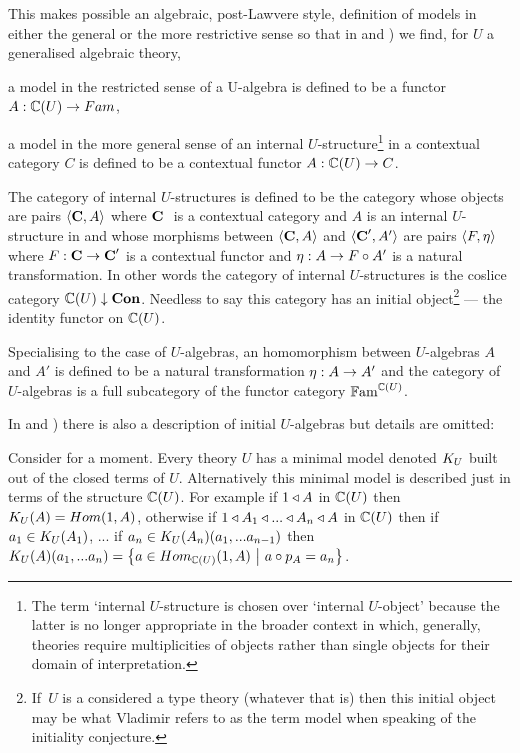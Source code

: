 {This makes possible an  algebraic, post-Lawvere
style,  definition of models in either the general or the more restrictive sense so that in 
\cite{Cartmell78} and  \cite{Cartmell86}) we find,
for $U$ a generalised algebraic theory, 
\begin{point}
 a model in the restricted sense of a U-algebra is defined to be a functor $A: \ccat[C](U) \morph Fam$, 
\end{point}
\begin{point}
a model in the more general sense of an internal $U$-structure\footnote{The  term `internal $U$-structure is chosen over `internal $U$-object' because the latter
is no longer appropriate in the broader context in which, generally, theories require multiplicities of objects rather than single objects for their domain of interpretation.} in a contextual category
$C$ is defined to be a contextual functor $A: \ccat[C](U) \morph C$.
\end{point}
The category of internal $U$-structures is defined to be the category whose objects
are pairs $\tuple{\catc,A}$ 
where $\catcw$ is a contextual 
category and $A$ is an internal 
$U$-structure in
 \catcw and whose morphisms between $\tuple{\catc,A}$ and $\tuple{\catc',A'}$ are pairs $\tuple{F, \eta}$ where
$F: \catc \morph \catc'$ is a contextual functor and $\eta: A  \morph  F \circ A'$ is a natural transformation.
In other words the category of internal $U$-structures
is  the coslice category
$\CofU \downarrow \catCon$. Needless to say this category has an initial object\footnote{If\ $U$ is a considered a type theory (whatever that is) then 
this initial object may be what Vladimir  refers
to as the term model when speaking of the initiality conjecture.}
--- the identity functor on  $\CofU$.
 
Specialising to the case of $U$-algebras,  
an homomorphism between $U$-algebras $A$ and $A'$ is defined to be a 
natural transformation $\eta: A \morph A'$ and the category of $U$-algebras is a full subcategory of the 
functor category $\Fam^{\CofU}$. 

\note 
In \cite{Cartmell78} and  \cite{Cartmell86}) there is also a description of initial $U$-algebras but details are omitted:
\begin{tightquote}
Consider for a moment. Every theory $U$ has a minimal model denoted $\KU$ built out of the closed terms of $U$. Alternatively this minimal model is described just in terms of the structure $\CofU$. For example
if $1 \base A$ in $\CofU$ then 
$\KU(A)=Hom(1,A)$, otherwise if $1 \base A_1 \base ... \base A_n \base A$ in $\CofU$
then if $a_1 \in \KU(A_1)$, ... if $a_n \in \KU(A_n)(a_1,...a_{n-1})$ then 
$\KU(A)(a_1,...a_n)=\setsuchthat{a\in Hom_{\CofU}(1,A)}{a \circ p_A = a_n}$. \\
\end{tightquote} 

}
